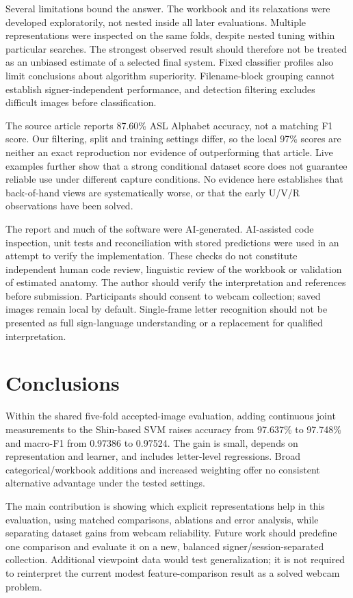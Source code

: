 \documentclass{article}
\begin{document}
Several limitations bound the answer. The workbook and its relaxations were developed exploratorily, not nested inside all later evaluations. Multiple representations were inspected on the same folds, despite nested tuning within particular searches. The strongest observed result should therefore not be treated as an unbiased estimate of a selected final system. Fixed classifier profiles also limit conclusions about algorithm superiority. Filename-block grouping cannot establish signer-independent performance, and detection filtering excludes difficult images before classification.

The source article reports 87.60\% ASL Alphabet accuracy, not a matching F1 score. Our filtering, split and training settings differ, so the local 97\% scores are neither an exact reproduction nor evidence of outperforming that article. Live examples further show that a strong conditional dataset score does not guarantee reliable use under different capture conditions. No evidence here establishes that back-of-hand views are systematically worse, or that the early U/V/R observations have been solved.

The report and much of the software were AI-generated. AI-assisted code inspection, unit tests and reconciliation with stored predictions were used in an attempt to verify the implementation. These checks do not constitute independent human code review, linguistic review of the workbook or validation of estimated anatomy. The author should verify the interpretation and references before submission. Participants should consent to webcam collection; saved images remain local by default. Single-frame letter recognition should not be presented as full sign-language understanding or a replacement for qualified interpretation.

\section{Conclusions}
Within the shared five-fold accepted-image evaluation, adding continuous joint measurements to the Shin-based SVM raises accuracy from 97.637\% to 97.748\% and macro-F1 from 0.97386 to 0.97524. The gain is small, depends on representation and learner, and includes letter-level regressions. Broad categorical/workbook additions and increased weighting offer no consistent alternative advantage under the tested settings.

The main contribution is showing which explicit representations help in this evaluation, using matched comparisons, ablations and error analysis, while separating dataset gains from webcam reliability. Future work should predefine one comparison and evaluate it on a new, balanced signer/session-separated collection. Additional viewpoint data would test generalization; it is not required to reinterpret the current modest feature-comparison result as a solved webcam problem.

\clearpage


\end{document}
